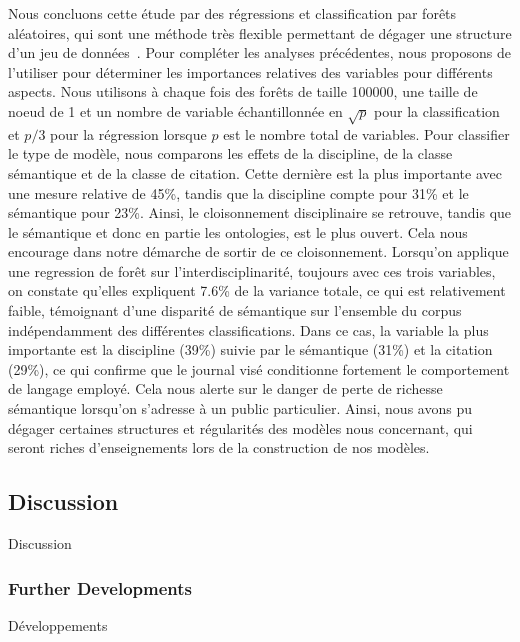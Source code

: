 Nous concluons cette étude par des régressions et classification par forêts aléatoires, qui sont une méthode très flexible permettant de dégager une structure d'un jeu de données~\cite{liaw2002classification}. Pour compléter les analyses précédentes, nous proposons de l'utiliser pour déterminer les importances relatives des variables pour différents aspects. Nous utilisons à chaque fois des forêts de taille 100000, une taille de noeud de 1 et un nombre de variable échantillonnée en $\sqrt{p}$ pour la classification et $p/3$ pour la régression lorsque $p$ est le nombre total de variables. Pour classifier le type de modèle, nous comparons les effets de la discipline, de la classe sémantique et de la classe de citation. Cette dernière est la plus importante avec une mesure relative de 45\%, tandis que la discipline compte pour 31\% et le sémantique pour 23\%. Ainsi, le cloisonnement disciplinaire se retrouve, tandis que le sémantique et donc en partie les ontologies, est le plus ouvert. Cela nous encourage dans notre démarche de sortir de ce cloisonnement. Lorsqu'on applique une regression de forêt sur l'interdisciplinarité, toujours avec ces trois variables, on constate qu'elles expliquent 7.6\% de la variance totale, ce qui est relativement faible, témoignant d'une disparité de sémantique sur l'ensemble du corpus indépendamment des différentes classifications. Dans ce cas, la variable la plus importante est la discipline (39\%) suivie par le sémantique (31\%) et la citation (29\%), ce qui confirme que le journal visé conditionne fortement le comportement de langage employé. Cela nous alerte sur le danger de perte de richesse sémantique lorsqu'on s'adresse à un public particulier. Ainsi, nous avons pu dégager certaines structures et régularités des modèles nous concernant, qui seront riches d'enseignements lors de la construction de nos modèles.



\subsection{Discussion}{Discussion}


\subsubsection{Further Developments}{Développements}

